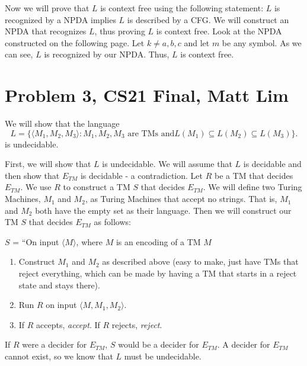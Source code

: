 \documentclass{article}
\begin{document}
Now we will prove that $L$ is context free using the following statement: $L$
is recognized by a NPDA implies $L$ is described by a CFG. We will construct
an NPDA that recognizes $L$, thus proving $L$ is context free.
 Look at the NPDA constructed on the following page. Let $k \neq a,b,c$ and let
 $m$ be any symbol. As we can see, $L$ is recognized by our NPDA. Thus, $L$ is
 context free.
\newpage

\section*{Problem 3, CS21 Final, Matt Lim}
We will show that the language
\[L= \{\langle M_1, M_2, M_3\rangle : M_1, M_2, M_3 \mbox{ are TMs and
} L(M_1) \subseteq L(M_2) \subseteq  L(M_3)\}.\]
is undecidable.

First, we will show that $L$ is undecidable.
We will assume that $L$ is decidable and then show that $E_{TM}$
is decidable - a contradiction. Let $R$ be a TM that decides $E_{TM}$. We use
$R$ to construct a TM $S$ that decides $E_{TM}$. We will define two Turing
Machines, $M_1$ and $M_2$, as Turing Machines that accept no strings. That is,
$M_1$ and $M_2$ both have the empty set as their language.
Then we will construct our TM $S$ that decides $E_{TM}$ as follows:

\noindent $S$ = ``On input $\langle M \rangle$, where $M$ is an encoding of a TM $M$
\begin{enumerate}
    \item Construct $M_1$ and $M_2$ as described above (easy to make,
        just have TMs that reject everything, which can be made by
        having a TM that starts in a reject state and stays there).
    \item Run $R$ on input $\langle M, M_1, M_2 \rangle$.
    \item If $R$ accepts, \textit{accept}. If $R$ rejects,
        \textit{reject}.
\end{enumerate}

If $R$ were a decider for $E_{TM}$, $S$ would be a decider for $E_{TM}$. A
decider for $E_{TM}$ cannot exist, so we know that $L$ must be undecidable.

\newpage

\end{document}
